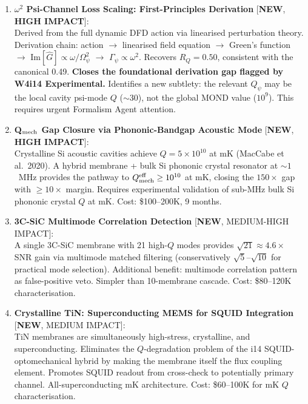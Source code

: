 \documentclass[11pt]{article}
\newcommand{\Opsi}{\Omega_\psi}
\newcommand{\ee}[1]{\times 10^{#1}}
\newcommand{\Qpsi}{Q_\psi}
\newcommand{\Qmech}{Q_{\rm mech}}
\theoremstyle{definition}
\theoremstyle{remark}
\begin{document}
\begin{tcolorbox}[colback=green!5!white, colframe=green!50!black,
  title=\textbf{W4i15 FINDINGS RANKED BY PROGRAMME IMPACT}]

\begin{enumerate}

\item \textbf{$\omega^2$ Psi-Channel Loss Scaling: First-Principles
  Derivation} [\textbf{NEW}, \textbf{HIGH IMPACT}]:\\
  Derived from the full dynamic DFD action via linearised
  perturbation theory. Derivation chain: action $\to$ linearised
  field equation $\to$ Green's function $\to$ Im$[\hat{G}] \propto
  \omega/\Opsi^2$ $\to$ $\Gamma_\psi \propto \omega^2$. Recovers
  $R_Q = 0.50$, consistent with the canonical 0.49. \textbf{Closes
  the foundational derivation gap flagged by W4i14 Experimental.}
  Identifies a new subtlety: the relevant $\Qpsi$ may be the local
  cavity psi-mode $Q$ ($\sim 30$), not the global MOND value
  ($10^9$). This requires urgent Formalism Agent attention.

\item \textbf{Q$_{\rm mech}$ Gap Closure via Phononic-Bandgap
  Acoustic Mode} [\textbf{NEW}, \textbf{HIGH IMPACT}]:\\
  Crystalline Si acoustic cavities achieve $Q = 5\ee{10}$ at mK
  (MacCabe et al.\ 2020). A hybrid membrane + bulk Si phononic
  crystal resonator at $\sim 1$~MHz provides the pathway to
  $\Qmech^{\rm eff} \geq 10^{10}$ at mK, closing the $150\times$
  gap with $\geq 10\times$ margin. Requires experimental validation
  of sub-MHz bulk Si phononic crystal $Q$ at mK.
  Cost: \$100--200K, 9 months.

\item \textbf{3C-SiC Multimode Correlation Detection}
  [\textbf{NEW}, MEDIUM-HIGH IMPACT]:\\
  A single 3C-SiC membrane with 21 high-$Q$ modes provides
  $\sqrt{21} \approx 4.6\times$ SNR gain via multimode matched
  filtering (conservatively $\sqrt{5}$--$\sqrt{10}$ for practical
  mode selection). Additional benefit: multimode correlation
  pattern as false-positive veto. Simpler than 10-membrane cascade.
  Cost: \$80--120K characterisation.

\item \textbf{Crystalline TiN: Superconducting MEMS for SQUID
  Integration} [\textbf{NEW}, MEDIUM IMPACT]:\\
  TiN membranes are simultaneously high-stress, crystalline, and
  superconducting. Eliminates the $Q$-degradation problem of the
  i14 SQUID-optomechanical hybrid by making the membrane itself
  the flux coupling element. Promotes SQUID readout from cross-check
  to potentially primary channel. All-superconducting mK architecture.
  Cost: \$60--100K for mK $Q$ characterisation.


\end{enumerate}
\end{tcolorbox}
\end{document}

